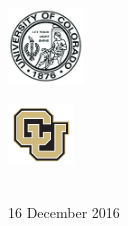 \documentclass[12pt]{extarticle}
\begin{document}
\begin{titlepage}
\begin{center}
\begin{minipage}{0.4\textwidth}
					\begin{flushleft} 
						\includegraphics[width=2cm]{Title/CUSeal.jpg}\\
					\end{flushleft}
				\end{minipage}
				\begin{minipage}{0.4\textwidth}
					\begin{flushright}
						\includegraphics[width=1.75cm]{Title/CULogo.jpg}\\
					\end{flushright}
				\end{minipage}\\
			{\small 16 December 2016}\\
		\end{center}
	\end{titlepage}
\newpage

\setcounter{tocdepth}{2}
\setcounter{secnumdepth}{2}
\tableofcontents	
\newpage
\hypersetup{%
  colorlinks=true,%
  linkcolor=blue,%
}
%
%   
%        
\end{document}
